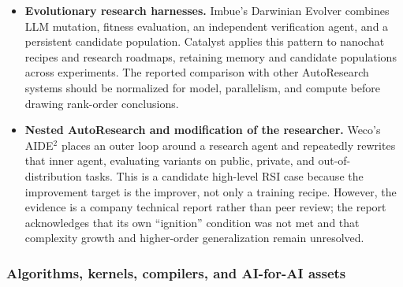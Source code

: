 \begin{itemize}
  \item \textbf{Evolutionary research harnesses.}
  Imbue's Darwinian Evolver combines LLM mutation, fitness evaluation, an
  independent verification agent, and a persistent candidate population.
  Catalyst applies this pattern to nanochat recipes and research roadmaps,
  retaining memory and candidate populations across experiments. The reported
  comparison with other AutoResearch systems should be normalized for model,
  parallelism, and compute before drawing rank-order conclusions.

  \item \textbf{Nested AutoResearch and modification of the researcher.}
  Weco's AIDE$^2$ places an outer loop around a research agent and repeatedly
  rewrites that inner agent, evaluating variants on public, private, and
  out-of-distribution tasks. This is a candidate high-level RSI case because
  the improvement target is the improver, not only a training recipe. However,
  the evidence is a company technical report rather than peer review; the report
  acknowledges that its own ``ignition'' condition was not met and that
  complexity growth and higher-order generalization remain unresolved.
\end{itemize}

\subsubsection{Algorithms, kernels, compilers, and AI-for-AI assets}

